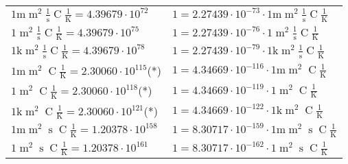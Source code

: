 \begin{center}
\begin{longtable}{l l}
{\color{gray}$1 \bm{\mathrm{ m}}{\operatorname{m}^2}\frac1{\operatorname{s}}{\operatorname{C}}\frac1{\operatorname{K}} = 4.39679\cdot10^{72} $}   & {\color{gray}$ 1 = 2.27439\cdot10^{-73} \cdot 1 \bm{\mathrm{ m}}{\operatorname{m}^2}\frac1{\operatorname{s}}{\operatorname{C}}\frac1{\operatorname{K}}$}  \\
{\color{black}$1 \bm{\mathrm{ }}{\operatorname{m}^2}\frac1{\operatorname{s}}{\operatorname{C}}\frac1{\operatorname{K}} = 4.39679\cdot10^{75} $}   & {\color{black}$ 1 = 2.27439\cdot10^{-76} \cdot 1 \bm{\mathrm{ }}{\operatorname{m}^2}\frac1{\operatorname{s}}{\operatorname{C}}\frac1{\operatorname{K}}$}  \\
{\color{gray}$1 \bm{\mathrm{ k}}{\operatorname{m}^2}\frac1{\operatorname{s}}{\operatorname{C}}\frac1{\operatorname{K}} = 4.39679\cdot10^{78} $}   & {\color{gray}$ 1 = 2.27439\cdot10^{-79} \cdot 1 \bm{\mathrm{ k}}{\operatorname{m}^2}\frac1{\operatorname{s}}{\operatorname{C}}\frac1{\operatorname{K}}$}  \\
{\color{gray}$1 \bm{\mathrm{ m}}{\operatorname{m}^2}{}{\operatorname{C}}\frac1{\operatorname{K}} = 2.30060\cdot10^{115} $}\quad(*) & {\color{gray}$ 1 = 4.34669\cdot10^{-116} \cdot 1 \bm{\mathrm{ m}}{\operatorname{m}^2}{}{\operatorname{C}}\frac1{\operatorname{K}}$}  \\
{\color{black}$1 \bm{\mathrm{ }}{\operatorname{m}^2}{}{\operatorname{C}}\frac1{\operatorname{K}} = 2.30060\cdot10^{118} $}\quad(*) & {\color{black}$ 1 = 4.34669\cdot10^{-119} \cdot 1 \bm{\mathrm{ }}{\operatorname{m}^2}{}{\operatorname{C}}\frac1{\operatorname{K}}$}  \\
{\color{gray}$1 \bm{\mathrm{ k}}{\operatorname{m}^2}{}{\operatorname{C}}\frac1{\operatorname{K}} = 2.30060\cdot10^{121} $}\quad(*) & {\color{gray}$ 1 = 4.34669\cdot10^{-122} \cdot 1 \bm{\mathrm{ k}}{\operatorname{m}^2}{}{\operatorname{C}}\frac1{\operatorname{K}}$}  \\
{\color{gray}$1 \bm{\mathrm{ m}}{\operatorname{m}^2}{\operatorname{s}}{\operatorname{C}}\frac1{\operatorname{K}} = 1.20378\cdot10^{158} $}   & {\color{gray}$ 1 = 8.30717\cdot10^{-159} \cdot 1 \bm{\mathrm{ m}}{\operatorname{m}^2}{\operatorname{s}}{\operatorname{C}}\frac1{\operatorname{K}}$}  \\
{\color{black}$1 \bm{\mathrm{ }}{\operatorname{m}^2}{\operatorname{s}}{\operatorname{C}}\frac1{\operatorname{K}} = 1.20378\cdot10^{161} $}   & {\color{black}$ 1 = 8.30717\cdot10^{-162} \cdot 1 \bm{\mathrm{ }}{\operatorname{m}^2}{\operatorname{s}}{\operatorname{C}}\frac1{\operatorname{K}}$}  \\

\end{longtable}
\end{center}
